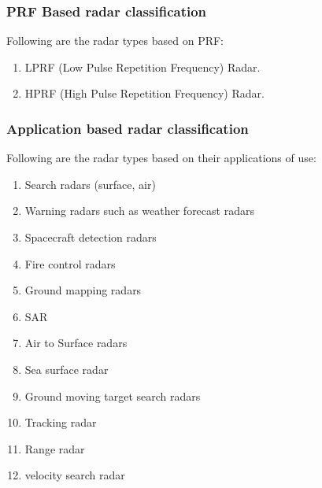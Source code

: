 \documentclass[12pt]{article} %
\begin{document}
\subsubsection{PRF Based radar classification}
\noindent Following are the radar types based on PRF:
\begin{enumerate}
\item	LPRF (Low Pulse Repetition Frequency) Radar.
\item	HPRF (High Pulse Repetition Frequency) Radar.
\end{enumerate}

\subsubsection{Application based radar classification}
 \noindent Following are the radar types based on their applications of use: 
\begin{enumerate}
\item	Search radars (surface, air)
\item	Warning radars such as weather forecast radars 
\item	Spacecraft detection radars
\item	Fire control radars
\item	Ground mapping radars
\item	SAR 
\item	Air to Surface radars 
\item	Sea surface radar 
\item	Ground moving target search radars 
\item	 Tracking radar
\item	 Range radar
\item	 velocity search radar
\end{enumerate}
\end{document}
